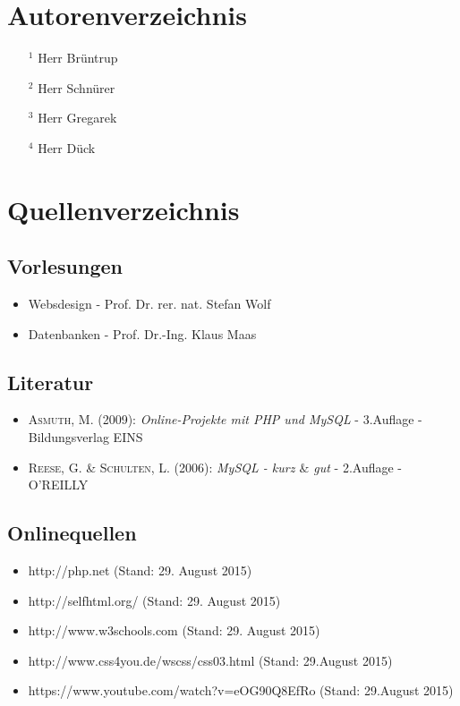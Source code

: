 \newpage
\section{Autorenverzeichnis}
\begin{itemize}
	\item[$^1$] Herr Brüntrup
	\item[$^2$] Herr Schnürer
	\item[$^3$] Herr Gregarek
	\item[$^4$] Herr Dück
\end{itemize}



\section{Quellenverzeichnis}

\subsection*{Vorlesungen}
\begin{itemize}
	\item Websdesign - Prof. Dr. rer. nat. Stefan Wolf
	\item Datenbanken - Prof. Dr.-Ing. Klaus Maas  
\end{itemize}

\subsection*{Literatur}
\begin{itemize}
	\item \textsc{Asmuth, M.} (2009): \textit{Online-Projekte mit PHP und MySQL} -  3.Auflage - \\ Bildungsverlag EINS
	\item \textsc{Reese, G. \&  Schulten, L.} (2006): \textit{MySQL - kurz $\&$ gut} -  2.Auflage - O'REILLY
\end{itemize}

\subsection*{Onlinequellen}
\begin{itemize}
	\item http://php.net (Stand: 29. August 2015)
	\item http://selfhtml.org/ (Stand: 29. August 2015)
	\item http://www.w3schools.com (Stand: 29. August 2015)
	\item http://www.css4you.de/wscss/css03.html (Stand: 29.August 2015)
	\item https://www.youtube.com/watch?v=eOG90Q8EfRo (Stand: 29.August 2015)
\end{itemize}